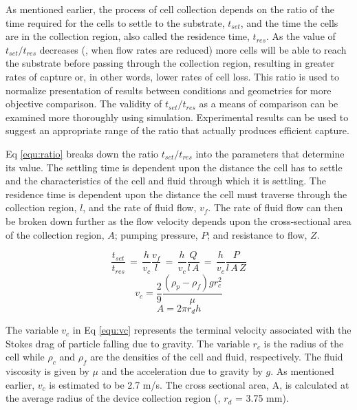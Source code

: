 As mentioned earlier, the process of cell collection depends on the ratio of the time required for the cells to settle to the substrate, $t_{set}$, and the time the cells are in the collection region, also called the residence time, $t_{res}$. As the value of $t_{set}/t_{res}$ decreases (\eg , when flow rates are reduced) more cells will be able to reach the substrate before passing through the collection region, resulting in greater rates of capture or, in other words, lower rates of cell loss. This ratio is used to normalize presentation of results between conditions and geometries for more objective comparison. The validity of $t_{set}/t_{res}$ as a means of comparison can be examined more thoroughly using simulation. Experimental results can be used to suggest an appropriate range of the ratio that actually produces efficient capture. 

Eq \ref{equ:ratio} breaks down the ratio $t_{set}/t_{res}$ into the parameters that determine its value. The settling time is dependent upon the distance the cell has to settle and the characteristics of the cell and fluid through which it is settling. The residence time is dependent upon the distance the cell must traverse through the collection region, $l$, and the rate of fluid flow, $v_{f}$. The rate of fluid flow can then be broken down further as the flow velocity depends upon the cross-sectional area of the collection region, $A$; pumping pressure, $P$; and resistance to flow, $Z$.

\begin{equation}\label{equ:ratio}
\frac{t_{set}}{t_{res}} \,=\, \frac{h}{v_{c}}\frac{v_{f}}{l} \,=\, \frac{h}{v_{c}}\frac{Q}{l\,A} \,=\, \frac{h}{v_{c}}\frac{P}{l\,A\,Z}
\end{equation}
\begin{equation}\label{equ:vc}
v_{c} = \frac{2}{9}\frac{(\rho_{p}-\rho_{f})gr_{c}^{2}}{\mu}
\end{equation}
\begin{equation}\label{equ:A}
A =2\pi r_{d}h
\end{equation}

The variable $v_{c}$ in Eq \ref{equ:vc} represents the terminal velocity associated with the Stokes drag of particle falling due to gravity. The variable $r_{c}$ is the radius of the cell while $\rho_{c}$ and  $\rho_{f}$ are the densities of the cell and fluid, respectively. The fluid viscosity is given by $\mu$ and the acceleration due to gravity by $g$. As mentioned earlier, $v_{c}$ is estimated to be 2.7 \textmu m/s. The cross sectional area, A, is calculated at the average radius of the device collection region (\ie , $r_{d}$ = 3.75 mm).

